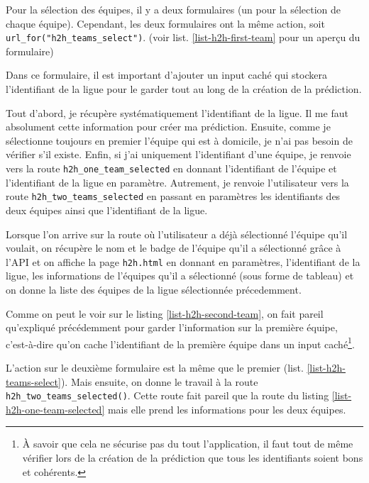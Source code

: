 \documentclass[a4paper,14pt]{extarticle}
\begin{document}
{Pour la sélection des équipes, il y a deux formulaires (un pour la sélection de chaque équipe). Cependant, les deux formulaires ont la même action, soit \texttt{url\_for("h2h\_teams\_select")}. (voir list. \ref{list-h2h-first-team} pour un aperçu du formulaire)


Dans ce formulaire, il est important d'ajouter un input caché qui stockera l'identifiant de la ligue pour le garder tout au long de la création de la prédiction.


Tout d'abord, je récupère systématiquement l'identifiant de la ligue. Il me faut absolument cette information pour créer ma prédiction. Ensuite, comme je sélectionne toujours en premier l'équipe qui est à domicile, je n'ai pas besoin de vérifier s'il existe. Enfin, si j'ai uniquement l'identifiant d'une équipe, je renvoie vers la route \texttt{h2h\_one\_team\_selected} en donnant l'identifiant de l'équipe et l'identifiant de la ligue en paramètre. Autrement, je renvoie l'utilisateur vers la route \texttt{h2h\_two\_teams\_selected} en passant en paramètres les identifiants des deux équipes ainsi que l'identifiant de la ligue.


Lorsque l'on arrive sur la route où l'utilisateur a déjà sélectionné l'équipe qu'il voulait, on récupère le nom et le badge de l'équipe qu'il a sélectionné grâce à l'API et on affiche la page \texttt{h2h.html} en donnant en paramètres, l'identifiant de la ligue, les informations de l'équipes qu'il a sélectionné (sous forme de tableau) et on donne la liste des équipes de la ligue sélectionnée précedemment.


Comme on peut le voir sur le listing \ref{list-h2h-second-team}, on fait pareil qu'expliqué précédemment pour garder l'information sur la première équipe, c'est-à-dire qu'on cache l'identifiant de la première équipe dans un input caché\footnote{À savoir que cela ne sécurise pas du tout l'application, il faut tout de même vérifier lors de la création de la prédiction que tous les identifiants soient bons et cohérents.}.

L'action sur le deuxième formulaire est la même que le premier (list. \ref{list-h2h-teams-select}). Mais ensuite, on donne le travail à la route \texttt{h2h\_two\_teams\_selected()}. Cette route fait pareil que la route du listing \ref{list-h2h-one-team-selected} mais elle prend les informations pour les deux équipes.

}
\end{document}
